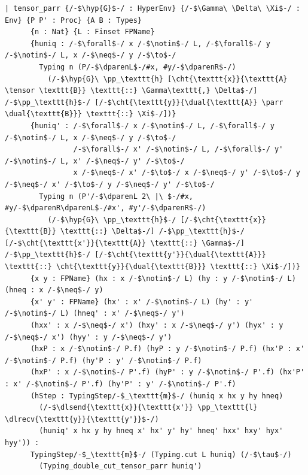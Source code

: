 \begin{lstlisting}[language=Lean4,
  caption={The typed transition relation \texttt{TypingStep}$_{\texttt{m}}$.},
  label={lst:app-typingstep}]
  | tensor_parr {/-$\hyp{G}$-/ : HyperEnv} {/-$\Gamma\ \Delta\ \Xi$-/ : Env} {P P' : Proc} {A B : Types} 
      {n : Nat} {L : Finset FPName}
      {huniq : /-$\forall$-/ x /-$\notin$-/ L, /-$\forall$-/ y /-$\notin$-/ L, x /-$\neq$-/ y /-$\to$-/
        Typing n (P/-$\dparenL$-/#x, #y/-$\dparenR$-/)
          (/-$\hyp{G}\ \pp_\texttt{h} [\cht{\texttt{x}}{\texttt{A} \tensor \texttt{B}} \texttt{::} \Gamma\texttt{,} \Delta$-/] /-$\pp_\texttt{h}$-/ [/-$\cht{\texttt{y}}{\dual{\texttt{A}} \parr \dual{\texttt{B}}} \texttt{::} \Xi$-/])}
      {huniq' : /-$\forall$-/ x /-$\notin$-/ L, /-$\forall$-/ y /-$\notin$-/ L, x /-$\neq$-/ y /-$\to$-/
                /-$\forall$-/ x' /-$\notin$-/ L, /-$\forall$-/ y' /-$\notin$-/ L, x' /-$\neq$-/ y' /-$\to$-/
                x /-$\neq$-/ x' /-$\to$-/ x /-$\neq$-/ y' /-$\to$-/ y /-$\neq$-/ x' /-$\to$-/ y /-$\neq$-/ y' /-$\to$-/
        Typing n (P'/-$\dparenL 2\ |\ $-/#x, #y/-$\dparenR\dparenL$-/#x', #y'/-$\dparenR$-/)
          (/-$\hyp{G}\ \pp_\texttt{h}$-/ [/-$\cht{\texttt{x}}{\texttt{B}} \texttt{::} \Delta$-/] /-$\pp_\texttt{h}$-/ [/-$\cht{\texttt{x'}}{\texttt{A}} \texttt{::} \Gamma$-/] /-$\pp_\texttt{h}$-/ [/-$\cht{\texttt{y'}}{\dual{\texttt{A}}} \texttt{::} \cht{\texttt{y}}{\dual{\texttt{B}}} \texttt{::} \Xi$-/])}
      {x y : FPName} (hx : x /-$\notin$-/ L) (hy : y /-$\notin$-/ L) (hneq : x /-$\neq$-/ y)
      {x' y' : FPName} (hx' : x' /-$\notin$-/ L) (hy' : y' /-$\notin$-/ L) (hneq' : x' /-$\neq$-/ y')
      (hxx' : x /-$\neq$-/ x') (hxy' : x /-$\neq$-/ y') (hyx' : y /-$\neq$-/ x') (hyy' : y /-$\neq$-/ y')
      (hxP : x /-$\notin$-/ P.f) (hyP : y /-$\notin$-/ P.f) (hx'P : x' /-$\notin$-/ P.f) (hy'P : y' /-$\notin$-/ P.f)
      (hxP' : x /-$\notin$-/ P'.f) (hyP' : y /-$\notin$-/ P'.f) (hx'P' : x' /-$\notin$-/ P'.f) (hy'P' : y' /-$\notin$-/ P'.f)
      (hStep : TypingStep/-$_\texttt{m}$-/ (huniq x hx y hy hneq)
        (/-$\dlsend{\texttt{x}}{\texttt{x'}} \pp_\texttt{l} \dlrecv{\texttt{y}}{\texttt{y'}}$-/)
        (huniq' x hx y hy hneq x' hx' y' hy' hneq' hxx' hxy' hyx' hyy')) :
      TypingStep/-$_\texttt{m}$-/ (Typing.cut L huniq) (/-$\tau$-/)
        (Typing_double_cut_tensor_parr huniq')


\end{lstlisting}
